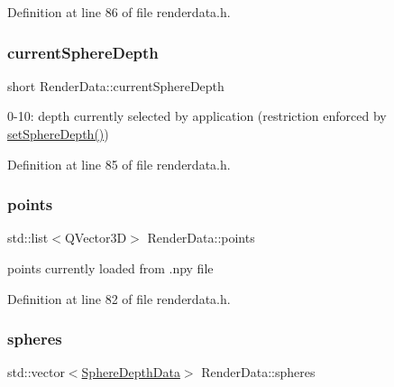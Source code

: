 Definition at line 86 of file renderdata.\+h.

\mbox{\label{class_render_data_addeb27eb3a3e9c8bf50a3615fbcc8752}} 
\subsubsection{\texorpdfstring{current\+Sphere\+Depth}{currentSphereDepth}}
{\footnotesize\ttfamily short Render\+Data\+::current\+Sphere\+Depth\hspace{0.3cm}{\ttfamily [private]}}



0-\/10\+: depth currently selected by application (restriction enforced by \hyperlink{class_render_data_a8d5f7285d29dc9ca0f93fcf2b5826283}{set\+Sphere\+Depth()}) 



Definition at line 85 of file renderdata.\+h.

\mbox{\label{class_render_data_aaab890b2c9bac7bb08d5f257e98a7cb9}} 
\subsubsection{\texorpdfstring{points}{points}}
{\footnotesize\ttfamily std\+::list$<$Q\+Vector3D$>$ Render\+Data\+::points\hspace{0.3cm}{\ttfamily [private]}}



points currently loaded from .npy file 



Definition at line 82 of file renderdata.\+h.

\mbox{\label{class_render_data_af8d7292450ad6bba825a6dbb75be217c}} 
\subsubsection{\texorpdfstring{spheres}{spheres}}
{\footnotesize\ttfamily std\+::vector$<$\hyperlink{struct_sphere_depth_data}{Sphere\+Depth\+Data}$>$ Render\+Data\+::spheres\hspace{0.3cm}{\ttfamily [private]}}



